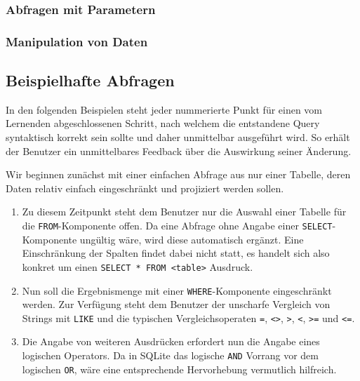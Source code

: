 \documentclass[paper=a4,fontsize=11pt,parskip=half]{scrartcl}
\begin{document}
\subsubsection{Abfragen mit Parametern}


\subsubsection{Manipulation von Daten}


\subsection{Beispielhafte Abfragen}
\label{sec:example-queries}

In den folgenden Beispielen steht jeder nummerierte Punkt für einen vom Lernenden abgeschlossenen Schritt, nach welchem die entstandene Query syntaktisch korrekt sein sollte und daher unmittelbar ausgeführt wird. So erhält der Benutzer ein unmittelbares Feedback über die Auswirkung seiner Änderung.

Wir beginnen zunächst mit einer einfachen Abfrage aus nur einer Tabelle, deren Daten relativ einfach eingeschränkt und projiziert werden sollen.

\begin{enumerate}
  \item Zu diesem Zeitpunkt steht dem Benutzer nur die Auswahl einer Tabelle für die \texttt{FROM}-Komponente offen. Da eine Abfrage ohne Angabe einer \texttt{SELECT}-Komponente ungültig wäre, wird diese automatisch ergänzt. Eine Einschränkung der Spalten findet dabei nicht statt, es handelt sich also konkret um einen \texttt{SELECT * FROM <table>} Ausdruck.
  \item Nun soll die Ergebnismenge mit einer \texttt{WHERE}-Komponente eingeschränkt werden. Zur Verfügung steht dem Benutzer der unscharfe Vergleich von Strings mit \texttt{LIKE} und die typischen Vergleichsoperaten \texttt{=}, \texttt{<>}, \texttt{>}, \texttt{<}, \texttt{>=} und \texttt{<=}.
  \item Die Angabe von weiteren Ausdrücken erfordert nun die Angabe eines logischen Operators. Da in SQLite das logische \texttt{AND} Vorrang vor dem logischen \texttt{OR}, wäre eine entsprechende Hervorhebung vermutlich hilfreich.
\end{enumerate}
\end{document}
